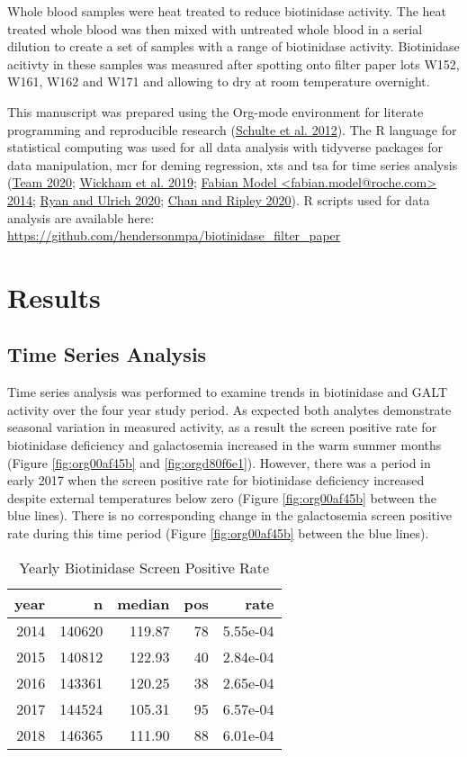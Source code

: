 \documentclass[review]{elsarticle}
\begin{document}
Whole blood samples were heat treated to reduce biotinidase
activity. The heat treated whole blood was then mixed with untreated
whole blood in a serial dilution to create a set of samples with a
range of biotinidase activity. Biotinidase acitivty in these samples
was measured after spotting onto filter paper lots W152, W161, W162
and W171 and allowing to dry at room temperature overnight.

This manuscript was prepared using the Org-mode environment for
literate programming and reproducible research (\hyperlink{citeproc_bib_item_6}{Schulte et al. 2012}). The R language for statistical computing was used
for all data analysis with tidyverse packages for
data manipulation, mcr for deming regression, xts and tsa for time
series analysis (\hyperlink{citeproc_bib_item_8}{Team 2020}; \hyperlink{citeproc_bib_item_11}{Wickham et al. 2019}; \hyperlink{citeproc_bib_item_3}{Fabian Model <fabian.model@roche.com> 2014}; \hyperlink{citeproc_bib_item_5}{Ryan and Ulrich 2020}; \hyperlink{citeproc_bib_item_2}{Chan and Ripley 2020}). R scripts
used for data analysis are available here:
\url{https://github.com/hendersonmpa/biotinidase\_filter\_paper}

\section*{Results}
\label{sec:org8f773d1}
\subsection*{Time Series Analysis}
\label{sec:org6327398}
Time series analysis was performed to examine trends in biotinidase
and GALT activity over the four year study period. As expected both
analytes demonstrate seasonal variation in measured activity, as a
result the screen positive rate for biotinidase deficiency and
galactosemia increased in the warm summer months (Figure \ref{fig:org00af45b}
and \ref{fig:orgd80f6e1}). However, there was a period in early 2017 when the
screen positive rate for biotinidase deficiency increased despite
external temperatures below zero (Figure \ref{fig:org00af45b} between the blue
lines). There is no corresponding change in the galactosemia screen
positive rate during this time period (Figure \ref{fig:org00af45b} between the
blue lines).

\begin{table}[ht]
\centering
\begin{tabular}{rrrrr}
  \hline
year & n & median & pos & rate \\ 
  \hline
2014 & 140620 & 119.87 &  78 & 5.55e-04 \\ 
  2015 & 140812 & 122.93 &  40 & 2.84e-04 \\ 
  2016 & 143361 & 120.25 &  38 & 2.65e-04 \\ 
  2017 & 144524 & 105.31 &  95 & 6.57e-04 \\ 
  2018 & 146365 & 111.90 &  88 & 6.01e-04 \\ 
   \hline
\end{tabular}
\caption{Yearly Biotinidase Screen Positive Rate} 
\label{tab:biot_year}
\end{table}
\end{document}
